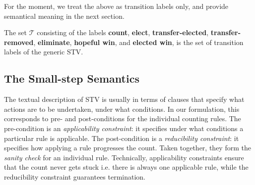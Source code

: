 \documentclass{llncs}
\begin{document}
\smallskip\noindent{}

\smallskip\noindent
For the moment, we treat the above as transition labels only, and
provide semantical meaning in the next section.

\begin{definition}\label{stv:trans}
The set $\mathcal{T}$ consisting of the labels \textbf{count}, \textbf{elect}, \textbf{transfer-elected}, \textbf{transfer-removed}, \textbf{eliminate}, \textbf{hopeful win}, and \textbf{elected win}, is the set of transition labels of the generic STV.
\end{definition}

\subsection{The Small-step Semantics}
The textual description of STV is usually in terms of clauses that
specify what actions are to be undertaken, under what conditions. In
our formulation, this corresponds to pre- and post-conditions for the
individual counting rules. The pre-condition is an
\emph{applicability constraint}: it specifies under what conditions
a particular rule is applicable. The post-condition is a
\emph{reducibility constraint}: it specifies how applying a rule
progresses the count.  Taken together, they form the \emph{sanity
check} for an individual rule. Technically, applicability
constraints ensure that the count never gets stuck i.e. there is
always one applicable rule, while the reducibility constraint guarantees termination. 
\end{document}
